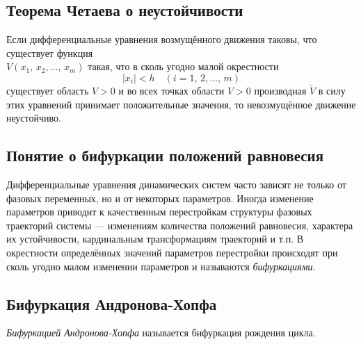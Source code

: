 \documentclass[a4paper]{article}
\begin{document}
\subsection{Теорема Четаева о неустойчивости}
\begin{thm}
	Если дифференциальные уравнения возмущённого движения таковы, что
	существует функция\\$V(x_1,\,x_2,\ldots,\,x_m)$
	такая, что в сколь угодно
	малой  окрестности
	 \[
		 |x_i|<h \quad (i=1,\,2,\ldots,\,m)
	\] 
	существует область $V>0$ и во всех точках области $V>0$ производная
	$\dot{V}$ в силу этих уравнений принимает положительные значения, то
	невозмущённое движение неустойчиво.
\end{thm}
\subsection{Понятие о бифуркации положений равновесия}
Дифференциальные уравнения динамических систем часто зависят не только от
фазовых переменных, но и от некоторых параметров.
Иногда изменение параметров приводит к качественным перестройкам  структуры
фазовых траекторий системы --- изменениям количества положений равновесия,
характера их устойчивости, кардинальным трансформациям траекторий и т.\;п.
В окрестности определённых значений параметров перестройки происходят при
сколь угодно малом изменении параметров и называются \emph{бифуркациями}.
\subsection{Бифуркация Андронова-Хопфа}
\emph{Бифуркацией Андронова-Хопфа} называется бифуркация рождения цикла.
\end{document}

